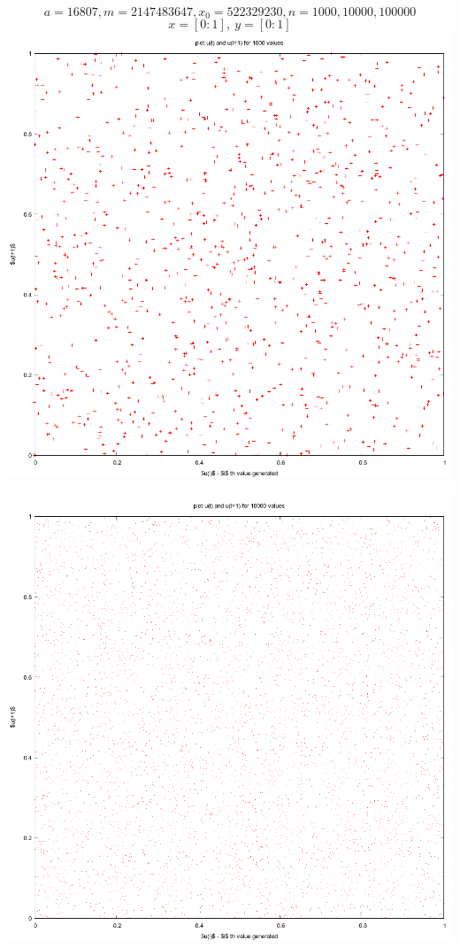 \documentclass{article}
\begin{document}
$$a = 16807, m = 2147483647, x_0 = 522329230, n = 1000,10000,100000$$
$$x = [0:1],\ y = [0:1]$$
\includegraphics[scale=0.45]{"dataplot1a"}
\pagebreak

\includegraphics[scale=0.45]{"dataplot1b"}\pagebreak
\end{document}
